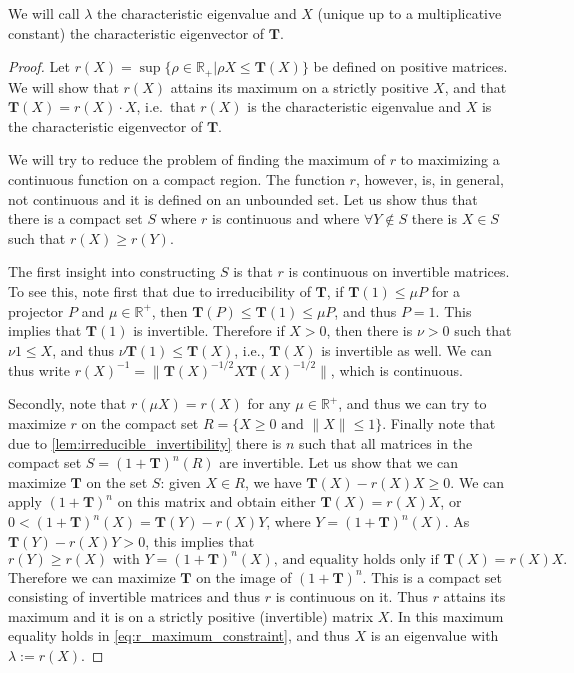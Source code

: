 \documentclass{article}
\begin{document}
We will call $\lambda$ the characteristic eigenvalue and $X$ (unique up to a multiplicative constant) the characteristic eigenvector of $\mathbf{T}$.

\begin{proof}
  Let $r(X) = \sup \{\rho\in \mathbb{R}_+| \rho X \leq \mathbf{T}(X) \}$ be defined on positive matrices. We will show that $r(X)$ attains its maximum on a strictly positive $X$, and that $\mathbf{T}(X) = r(X)\cdot X$, i.e.\ that $r(X)$ is the characteristic eigenvalue and $X$ is the characteristic eigenvector of  $\mathbf{T}$.  
  
  We will try to reduce the problem of finding the maximum of $r$ to maximizing a continuous function on a compact region. The function $r$, however, is, in general, not continuous and it is defined on an unbounded set. Let us show thus that there is a compact set $S$ where $r$ is continuous and where $\forall Y\notin S$ there is $X\in S$ such that $r(X)\geq r(Y)$. 
  
  The first insight into constructing $S$ is that $r$ is continuous on invertible matrices. To see this, note first that due to irreducibility of $\mathbf{T}$, if $\mathbf{T}(1)\leq \mu P$ for a projector $P$ and $\mu\in \mathbb{R}^+$, then $\mathbf{T}(P)\leq \mathbf{T}(1) \leq \mu P$, and thus $P=1$. This implies that $\mathbf{T}(1)$ is invertible. Therefore if $X>0$, then there is $\nu>0$ such that $\nu 1 \leq X$, and thus $ \nu \mathbf{T}(1)\leq \mathbf{T}(X)$, i.e., $\mathbf{T}(X)$ is invertible as well. We can thus write $r(X)^{-1} = \|\mathbf{T}(X)^{-1/2}X \mathbf{T}(X)^{-1/2}\|$, which is continuous.
  
  Secondly, note that $r(\mu X) = r(X)$ for any $\mu\in\mathbb{R}^+$, and thus we can try to maximize $r$ on the compact set $R = \{ X\geq 0 \text{ and } \|X\|\leq 1\}$. Finally note that due to \cref{lem:irreducible_invertibility} there is $n$ such that all matrices in the compact set $S = (1+\mathbf{T})^n(R)$ are invertible. Let us show that we can maximize $\mathbf{T}$ on the set $S$: given $X\in R$, we have $\mathbf{T}(X) - r(X) X\geq 0$. We can apply $(1+\mathbf{T})^n$ on this matrix and obtain either $\mathbf{T}(X) = r(X) X$, or $0 < (1+\mathbf{T})^n(X) = \mathbf{T}(Y)- r(X) Y$, where $Y = (1+\mathbf{T})^n(X)$. As $\mathbf{T}(Y)- r(X) Y> 0$, this implies that 
  \begin{equation}\label{eq:r_maximum_constraint}
    r(Y) \geq r(X) \text{ with $Y = (1+\mathbf{T})^n(X)$, and equality holds only if  $\mathbf{T}(X) = r(X) X$}.
  \end{equation}
  Therefore we can maximize $\mathbf{T}$ on the image of $(1+\mathbf{T})^n$. This is a compact set consisting of invertible matrices and thus $r$ is continuous on it. Thus $r$ attains its maximum and it is on a strictly positive (invertible) matrix $X$. In this maximum equality holds in \cref{eq:r_maximum_constraint}, and thus $X$ is an eigenvalue with $\lambda:=r(X)$.
  

\end{proof}
\end{document}
